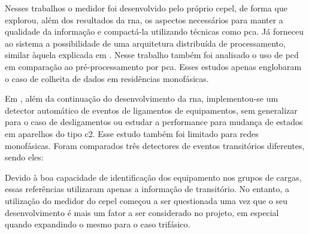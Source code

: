 
Nesses trabalhos o medidor foi desenvolvido pelo próprio \gls{cepel},
de forma que \cite{nilm_cepel_aguiar} explorou, além dos resultados
da \gls{rna}, os aspectos necessários para manter a
qualidade da informação e compactá-la utilizando técnicas como
\gls{pca}. Já \cite{nilm_cepel_bezerra} forneceu ao sistema a
possibilidade de uma arquitetura distribuída de processamento, similar
àquela explicada em \cite{nilm_bergman_distribuido_2011}. Nesse
trabalho também foi analisado o uso de \gls{pcd} em comparação ao
pré-processamento por \gls{pca}. Esses estudos apenas englobaram o
caso de colheita de dados em residências monofásicas.

Em \cite{nilm_cepel_alvaro}, além da continuação do desenvolvimento da
\gls{rna}, implementou-se um detector automático de eventos de
ligamentos de equipamentos, sem generalizar para o caso de
desligamentos ou estudar a performance para mudança de estados em
aparelhos do tipo \gls{c2}. Esse estudo também foi limitado para
redes monofásicas. Foram comparados três detectores de eventos
transitórios diferentes, sendo eles:


Devido à boa capacidade de identificação dos equipamento nos grupos de
cargas, essas referências utilizaram apenas a informação de
transitório. No entanto, a utilização do medidor do \gls{cepel}
começou a ser questionada uma vez que o seu desenvolvimento é mais um
fator a ser considerado no projeto, em especial quando expandindo o
mesmo para o caso trifásico.



